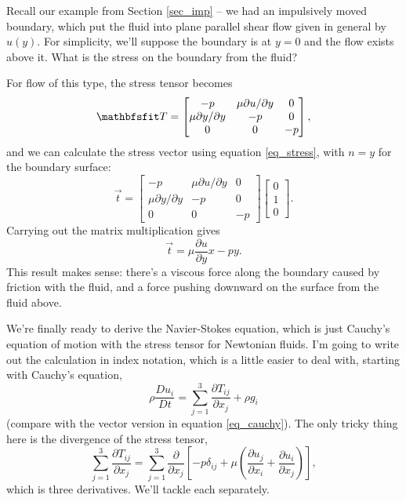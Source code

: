 \begin{example}
Recall our example from Section \ref{sec_imp} -- we had an impulsively moved boundary, which put the fluid into plane parallel shear flow given in general by $u(y)$.  For simplicity, we'll suppose the boundary is at $y=0$ and the flow exists above it.  What is the stress on the boundary from the fluid?

For flow of this type, the stress tensor becomes
\begin{equation}
\tens{T} = \begin{bmatrix}
-p & \mu \partial u / \partial y & 0 \\
\mu \partial y / \partial y & -p & 0 \\
0 & 0 & -p
\end{bmatrix},
\end{equation}
and we can calculate the stress vector using equation \ref{eq_stress}, with $\unit{n} = \unit{y}$ for the boundary surface:
\[
\vec{t} = \begin{bmatrix}
-p & \mu \partial u / \partial y & 0 \\
\mu \partial y / \partial y & -p & 0 \\
0 & 0 & -p
\end{bmatrix}
\begin{bmatrix}
0 \\ 1 \\ 0
\end{bmatrix}.
\]
Carrying out the matrix multiplication gives
\[
\vec{t} = \mu \frac{\partial u}{\partial y} \unit{x} - p \unit{y}.
\]
This result makes sense: there's a viscous force along the boundary caused by friction with the fluid, and a force pushing downward on the surface from the fluid above.
\end{example}

We're finally ready to derive the Navier-Stokes equation, which is just Cauchy's equation of motion with the stress tensor for Newtonian fluids.  I'm going to write out the calculation in index notation, which is a little easier to deal with, starting with Cauchy's equation,
\[
\rho \frac{Du_i}{Dt} = \sum_{j=1}^3 \frac{\partial T_{ij}}{\partial x_j} + \rho g_i
\]
(compare with the vector version in equation \ref{eq_cauchy}).  The only tricky thing here is the divergence of the stress tensor,
\[
\sum_{j=1}^3 \frac{\partial T_{ij}}{\partial x_j} = \sum_{j=1}^3 \frac{\partial }{\partial x_j} \left[ -p \delta_{ij} + \mu \left( \frac{\partial u_j}{\partial x_i} + \frac{\partial u_i}{\partial x_j} \right) \right],
\]
which is three derivatives.  We'll tackle each separately.

